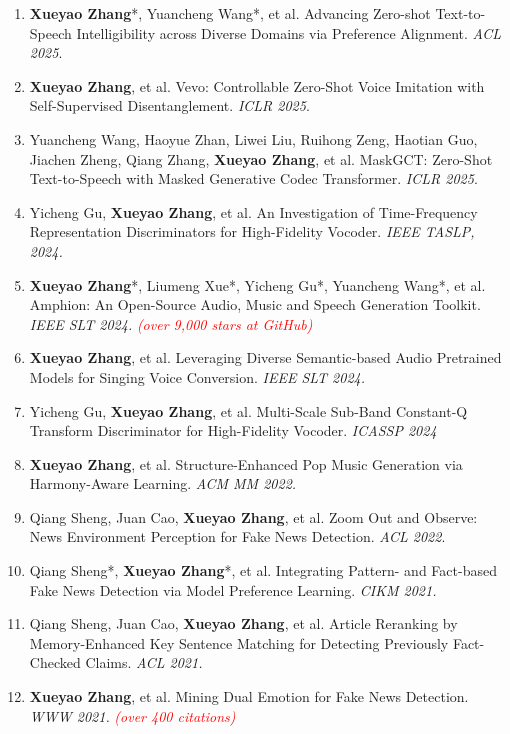 \documentclass{resume}
\begin{document}
\begin{enumerate}\itemsep 0.5em
  \item \textbf{Xueyao Zhang}*, Yuancheng Wang*, et al. Advancing Zero-shot Text-to-Speech Intelligibility across Diverse Domains via Preference Alignment. \textit{ACL 2025}.
  \item \textbf{Xueyao Zhang}, et al. Vevo: Controllable Zero-Shot Voice Imitation with Self-Supervised Disentanglement. \textit{ICLR 2025}.
  \item Yuancheng Wang, Haoyue Zhan, Liwei Liu, Ruihong Zeng, Haotian Guo, Jiachen Zheng, Qiang Zhang, \textbf{Xueyao Zhang}, et al. MaskGCT: Zero-Shot Text-to-Speech with Masked Generative Codec Transformer. \textit{ICLR 2025}.
  \item Yicheng Gu, \textbf{Xueyao Zhang}, et al. An Investigation of Time-Frequency Representation Discriminators for High-Fidelity Vocoder. \textit{IEEE TASLP, 2024.}
  \item \textbf{Xueyao Zhang}*, Liumeng Xue*, Yicheng Gu*, Yuancheng Wang*, et al. Amphion: An Open-Source Audio, Music and Speech Generation Toolkit. \textit{IEEE SLT 2024.} \textcolor{red}{\textit{(over 9,000 stars at GitHub)}}
  \item \textbf{Xueyao Zhang}, et al. Leveraging Diverse Semantic-based Audio Pretrained Models for Singing Voice Conversion. \textit{IEEE SLT 2024.}
  \item Yicheng Gu, \textbf{Xueyao Zhang}, et al. Multi-Scale Sub-Band Constant-Q Transform Discriminator for High-Fidelity Vocoder. \textit{ICASSP 2024}
  \item \textbf{Xueyao Zhang}, et al. Structure-Enhanced Pop Music Generation via Harmony-Aware Learning. \textit{ACM MM 2022.}
  \item Qiang Sheng, Juan Cao, \textbf{Xueyao Zhang}, et al. Zoom Out and Observe: News Environment Perception for Fake News Detection. \textit{ACL 2022}.
  \item Qiang Sheng*, \textbf{Xueyao Zhang}*, et al. Integrating Pattern- and
  Fact-based Fake News Detection via Model Preference Learning.
  \textit{CIKM 2021.}
  \item Qiang Sheng, Juan Cao, \textbf{Xueyao Zhang}, et al. Article Reranking by Memory-Enhanced Key Sentence Matching for Detecting Previously Fact-Checked Claims. \textit{ACL 2021.}
  \item \textbf{Xueyao Zhang}, et al. Mining Dual Emotion for Fake News Detection. \textit{WWW 2021.} \textcolor{red}{\textit{(over 400 citations)}}
\end{enumerate}
\end{document}
